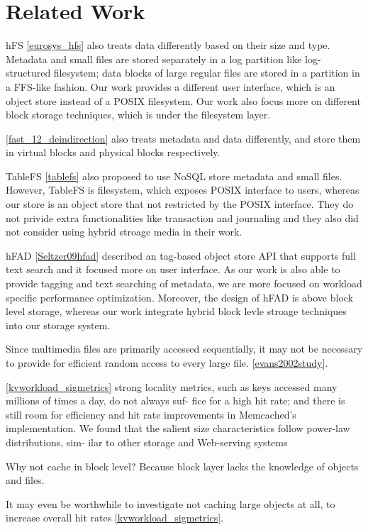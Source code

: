 \section{Related Work} 
\label{sec:related} 

hFS \ref{eurosys_hfs} also treats data differently based on their size and
type. Metadata and small files are stored separately in a log partition like
log-structured filesystem; data blocks of large regular files are stored in a
partition in a FFS-like fashion. Our work provides a different user interface,
which is an object store instead of a POSIX filesystem. Our work also focus
more on different block storage techniques, which is under the filesystem
layer.

\ref{fast_12_deindirection} also treats metadata and data differently, and
store them in virtual blocks and physical blocks respectively.

TableFS \ref{tablefs} also proposed to use NoSQL store metadata and small
files. However, TableFS is filesystem, which exposes POSIX interface to users,
whereas our store is an object store that not restricted by the POSIX
interface.  They do not privide extra functionalities like transaction and
journaling and they also did not consider using hybrid stroage media in their
work.

hFAD \ref{Seltzer09hfad} described an tag-based object store API that supports
full text search and it focused more on user interface. As our work is also
able to provide tagging and text searching of metadata, we are more focused on
workload specific performance optimization. Moreover, the design of hFAD is
above block level storage, whereas our work integrate hybrid block levle
stroage techniques into our storage system.

Since multimedia files are primarily accessed sequentially, it may not be
necessary to provide for efficient random access to every large file.
\ref{evans2002study}.

\ref{kvworkload_sigmetrics} strong locality metrics, such as keys accessed many
millions of times a day, do not always suf- fice for a high hit rate; and there
is still room for efficiency and hit rate improvements in Memcached’s
implementation.  We found that the salient size characteristics follow
power-law distributions, sim- ilar to other storage and Web-serving systems

Why not cache in block level? Because block layer lacks the knowledge of
objects and files.  

It may even be worthwhile to investigate not caching large objects at all, to
increase overall hit rates \ref{kvworkload_sigmetrics}.

